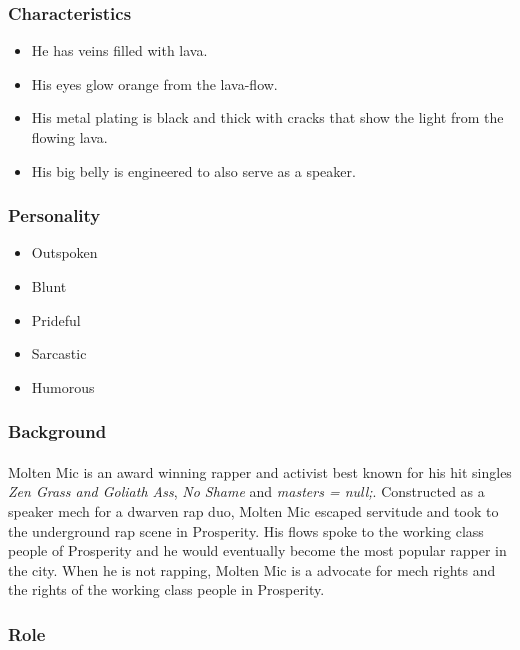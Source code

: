 \subsubsection{Characteristics}

\begin{itemize}
    \item He has veins filled with lava.
    \item His eyes glow orange from the lava-flow.
    \item His metal plating is black and thick with cracks that show the light from the flowing lava.
    \item His big belly is engineered to also serve as a speaker.
\end{itemize}

\subsubsection{Personality}

\begin{itemize}
    \item Outspoken
    \item Blunt
    \item Prideful
    \item Sarcastic
    \item Humorous
\end{itemize}

\subsubsection{Background}

\paragraph{} Molten Mic is an award winning rapper and activist best known for his hit singles \textit{Zen Grass and Goliath Ass}, \textit{No Shame} and \textit{masters = null;}. Constructed as a speaker mech for a dwarven rap duo, Molten Mic escaped servitude and took to the underground rap scene in Prosperity. His flows spoke to the working class people of Prosperity and he would eventually become the most popular rapper in the city. When he is not rapping, Molten Mic is a advocate for mech rights and the rights of the working class people in Prosperity.

\subsubsection{Role}

